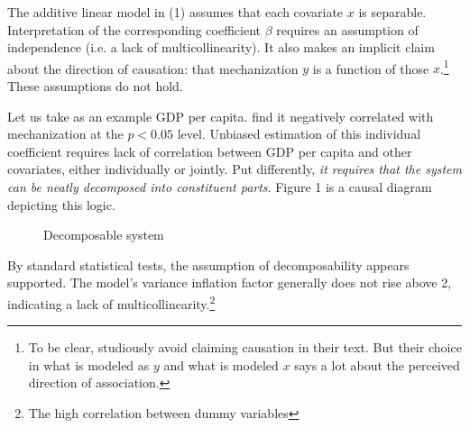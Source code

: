 \documentclass{article}
\begin{document}
The additive linear model in (1) assumes that each covariate $x$ is separable.  
Interpretation of the corresponding coefficient $\beta$ requires an assumption of independence 
(i.e. a lack of multicollinearity). It also makes an implicit claim about the direction of
causation: that mechanization $y$ is a function of those 
$x$.\footnote{To be clear,
\citet{sechser2010army} studiously avoid claiming causation in their text. But
their choice in what is modeled as $y$ and what is modeled $x$ says a lot about the perceived
direction of association.} These assumptions do not hold. 

Let us take as an example GDP per capita. \citet{sechser2010army} find it negatively correlated with
mechanization at the $p < 0.05$ level. Unbiased estimation of this individual coefficient
requires lack of correlation between GDP per capita and other covariates, either individually or
jointly. Put differently, \textit{it requires that the system can be neatly decomposed into constituent parts}. Figure 1 is a
causal diagram depicting this logic. 
\begin{figure}[h]
	\centering
	\caption{Decomposable system}
\end{figure}

By standard statistical tests, the assumption of decomposability appears supported. The model's variance
inflation factor generally does not rise above 2, indicating a lack of
multicollinearity.\footnote{The high correlation between dummy variables}
\end{document}
